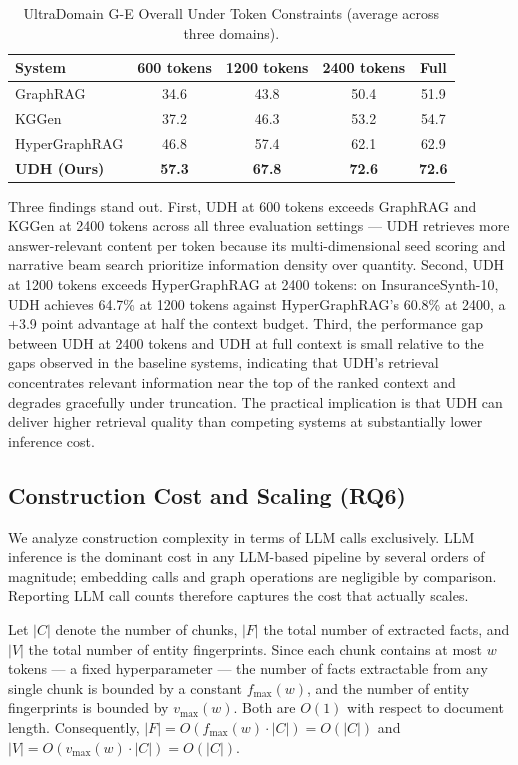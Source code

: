\documentclass[runningheads]{llncs}
\begin{document}
\begin{table}[h]
\centering
\caption{UltraDomain G-E Overall Under Token Constraints (average across three domains).}
\label{tab:token_ultra}
\begin{tabular}{lcccc}
\hline
\textbf{System} & \textbf{600 tokens} & \textbf{1200 tokens} & \textbf{2400 tokens} & \textbf{Full} \\
\hline
GraphRAG         & 34.6 & 43.8 & 50.4 & 51.9 \\
KGGen            & 37.2 & 46.3 & 53.2 & 54.7 \\
HyperGraphRAG    & 46.8 & 57.4 & 62.1 & 62.9 \\
\textbf{UDH (Ours)} & \textbf{57.3} & \textbf{67.8} & \textbf{72.6} & \textbf{72.6} \\
\hline
\end{tabular}
\end{table}

Three findings stand out. First, UDH at 600 tokens exceeds GraphRAG and KGGen at 2400 tokens across all three evaluation settings --- UDH retrieves more answer-relevant content per token because its multi-dimensional seed scoring and narrative beam search prioritize information density over quantity. Second, UDH at 1200 tokens exceeds HyperGraphRAG at 2400 tokens: on InsuranceSynth-10, UDH achieves 64.7\% at 1200 tokens against HyperGraphRAG's 60.8\% at 2400, a +3.9 point advantage at half the context budget. Third, the performance gap between UDH at 2400 tokens and UDH at full context is small relative to the gaps observed in the baseline systems, indicating that UDH's retrieval concentrates relevant information near the top of the ranked context and degrades gracefully under truncation. The practical implication is that UDH can deliver higher retrieval quality than competing systems at substantially lower inference cost.

\subsection{Construction Cost and Scaling (RQ6)}

We analyze construction complexity in terms of LLM calls exclusively. LLM inference is the dominant cost in any LLM-based pipeline by several orders of magnitude; embedding calls and graph operations are negligible by comparison. Reporting LLM call counts therefore captures the cost that actually scales.

Let $|C|$ denote the number of chunks, $|F|$ the total number of extracted facts, and $|V|$ the total number of entity fingerprints. Since each chunk contains at most $w$ tokens --- a fixed hyperparameter --- the number of facts extractable from any single chunk is bounded by a constant $f_{\max}(w)$, and the number of entity fingerprints is bounded by $v_{\max}(w)$. Both are $O(1)$ with respect to document length. Consequently, $|F| = O(f_{\max}(w) \cdot |C|) = O(|C|)$ and $|V| = O(v_{\max}(w) \cdot |C|) = O(|C|)$.
\end{document}
